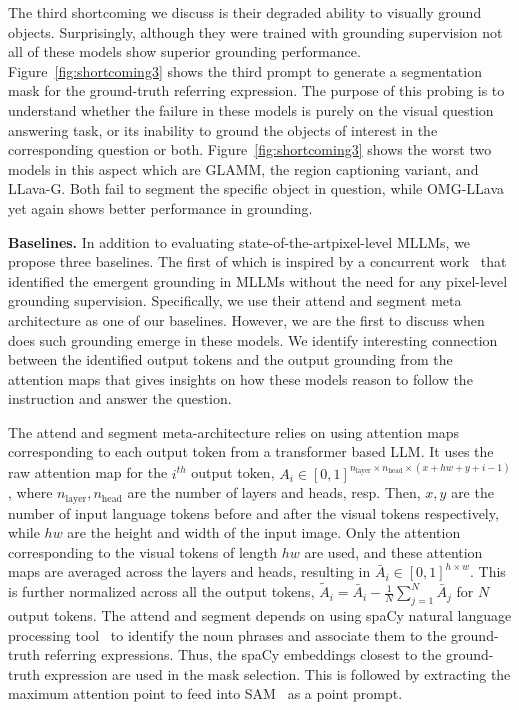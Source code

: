 The third shortcoming we discuss is their degraded ability to visually ground objects. Surprisingly, although they were trained with grounding supervision not all of these models show superior grounding performance. Figure~\ref{fig:shortcoming3} shows the third prompt to generate a segmentation mask for the ground-truth referring expression. The purpose of this probing is to understand whether the failure in these models is purely on the visual question answering task, or its inability to ground the objects of interest in the corresponding question or both. Figure~\ref{fig:shortcoming3} shows the worst two models in this aspect which are GLAMM, the region captioning variant, and LLava-G. Both fail to segment the specific object in question, while OMG-LLava yet again shows better performance in grounding.


\textbf{Baselines.} In addition to evaluating state-of-the-artpixel-level MLLMs, we propose three baselines. The first of which is inspired by a concurrent work~\cite{cao2024emerging} that identified the emergent grounding in MLLMs without the need for any pixel-level grounding supervision. Specifically, we use their attend and segment meta architecture as one of our baselines. However, we are the first to discuss when does such grounding emerge in these models. We identify interesting connection between the identified output tokens and the output grounding from the attention maps that gives insights on how these models reason to follow the instruction and answer the question. 

The attend and segment meta-architecture relies on using attention maps corresponding to each output token from a transformer based LLM. It uses the raw attention map for the $i^{th}$ output token, $A_i \in [0, 1]^{n_{\text{layer}} \times n_{\text{head}} \times (x+hw+y+i-1)}$, where $n_{\text{layer}}, n_{\text{head}}$  are the number of layers and heads, resp. Then, $x,y$ are the number of input language tokens before and after the visual tokens respectively, while $hw$ are the height and width of the input image. Only the attention corresponding to the visual tokens of length $hw$ are used, and these attention maps are averaged across the layers and heads, resulting in $\bar{A}_i \in [0, 1]^{h \times w}$. This is further normalized across all the output tokens, $\tilde{A}_i = \bar{A}_i - \frac{1}{N} \sum_{j=1}^{N}{\bar{A}_j}$ for $N$ output tokens. The attend and segment depends on using spaCy natural language processing tool~\cite{spaCy} to identify the noun phrases and associate them to the ground-truth referring expressions. Thus, the spaCy embeddings closest to the ground-truth expression are used in the mask selection. This is followed by extracting the maximum attention point to feed into SAM~\cite{kirillov2023segment} as a point prompt.


